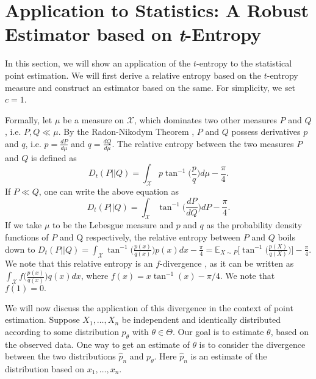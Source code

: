 \documentclass{article}
\begin{document}
\section{Application to Statistics: A Robust Estimator based on \textit{t}-Entropy}\label{stat}
In this section, we will show an application of the $t$-entropy to the statistical point estimation. We will first derive a relative entropy based on the $t$-entropy measure and construct an estimator based on the same. For simplicity, we set $c=1$.\par
Formally, let $\mu$ be a measure on $\mathcal{X}$, which dominates two other measures $P$ and $Q$, i.e. $P,Q\ll \mu$. By the  Radon-Nikodym Theorem \citep{billingsley2008probability}, $P$ and $Q$ possess derivatives $p$ and $q$, i.e. $p=\frac{dP}{d\mu}$ and $q=\frac{dQ}{d\mu}$. The relative entropy between the two measures $P$ and $Q$ is defined as 
\begin{equation}
    D_t(P||Q)=\int_{\mathcal{X}}p \tan^{-1}\bigg(\frac{p}{q}\bigg)d\mu-\frac{\pi}{4}.
\end{equation}
If $P \ll Q$, one can write the above equation as 
\begin{equation}
    D_t(P||Q)=\int_{\mathcal{X}} \tan^{-1}\bigg(\frac{dP}{dQ}\bigg)dP-\frac{\pi}{4}.
\end{equation}
If we take $\mu$ to be the Lebesgue measure and $p$ and $q$ as the probability density functions of $P$ and Q respectively, the relative entropy between $P$ and $Q$ boils down to $D_t(P||Q)=\int_{\mathcal{X}} \tan^{-1}\Big(\frac{p(x)}{q(x)}\Big)p(x)dx-\frac{\pi}{4}=\mathbb{E}_{X\sim P}\bigg[\tan^{-1}\Big(\frac{p(X)}{q(X)}\Big)\bigg]-\frac{\pi}{4}.$ We note that this relative entropy is an $f$-divergence \citep{csiszar1975divergence}, as it can be written as $\int_{\mathcal{X}} f\big(\frac{p(x)}{q(x)}\big)q(x)dx$, where $f(x)=x \tan^{-1}(x)-\pi/4$. We note that $f(1)=0.$ \par
We will now discuss the application of this divergence in the context of point estimation. Suppose $X_1,\dots,X_n$ be independent and identically distributed according to some distribution $p_\theta$ with $\theta \in \Theta$. Our goal is to estimate $\theta$, based on the observed data. One way to get an estimate of $\theta$ is to consider the divergence between the two distributions $\hat{p}_n$ and $p_\theta$. Here $\hat{p}_n$ is an estimate of the distribution based on $x_1,\dots,x_n$. %
\end{document}

